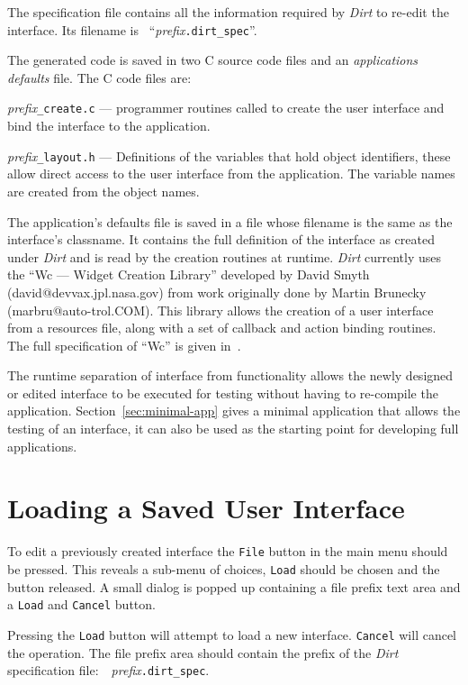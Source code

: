 The specification file contains all the information required by {\em Dirt} to
re-edit the interface.  Its filename is ~``{\em prefix}{\tt .dirt\_spec}''.

The generated code is saved in two C source code files and an
{\em applications defaults} file.  The C code files are:\begin{description}
\item{{\em prefix}{\tt \_create.c}} ---
programmer routines called to create the user interface and bind the interface
to the application.
\item{{\em prefix}{\tt \_layout.h}} ---
Definitions of the variables that hold object identifiers, these allow direct
access to the user interface from the application.  The variable names are
created from the object names.
\end{description}
The application's defaults file is saved in a file whose filename is the same
as the interface's classname.  It contains the full definition of the
interface as created under {\em Dirt} and is read by the creation routines at
runtime.  {\em Dirt} currently uses the ``Wc --- Widget Creation Library''
developed by David Smyth {(david@devvax.jpl.nasa.gov)} from work originally
done by Martin Brunecky {(marbru@auto-trol.COM)}.  This library allows the
creation of a user interface from a resources file, along with a set of
callback and action binding routines.  The full specification of ``Wc'' is
given in~\cite{Wcl}. 

The runtime separation of interface from functionality allows the
newly designed or edited interface to be executed for testing without having
to re-compile the application.  Section~\ref{sec:minimal-app} gives a minimal
application that allows the testing of an interface, it can also be used as
the starting point for developing full applications.

\section{Loading a Saved User Interface}
\label{sec:loading}
To edit a previously created interface the {\tt File} button in the main menu
should be pressed.  This reveals a sub-menu of choices, {\tt Load} should be
chosen and the button released.  A small dialog is popped up containing a
file prefix text area and a {\tt Load} and {\tt Cancel} button.

Pressing the {\tt Load} button will attempt to load a new interface.
{\tt Cancel} will cancel the operation.  The file prefix area should contain
the prefix of the {\em Dirt} specification
file:~~{\em prefix}{\tt .dirt\_spec}.

